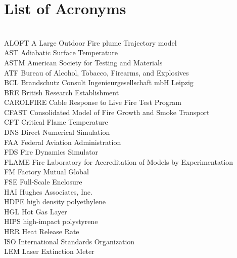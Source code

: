 \documentclass[11pt]{book}
\begin{document}
\cleardoublepage
{}
{}
\tableofcontents

\cleardoublepage
{}
{}
\listoffigures

\cleardoublepage
{}
{}
\listoftables

\chapter{List of Acronyms}

\begin{tabbing}
\hspace{1.5in} \= \\
ALOFT \> A Large Outdoor Fire plume Trajectory model \\
AST \> Adiabatic Surface Temperature \\
ASTM \> American Society for Testing and Materials \\
ATF \> Bureau of Alcohol, Tobacco, Firearms, and Explosives \\
BCL \> Brandschutz Consult Ingenieurgesellschaft mbH Leipzig \\
BRE \> British Research Establishment \\
CAROLFIRE \> Cable Response to Live Fire Test Program \\
CFAST \> Consolidated Model of Fire Growth and Smoke Transport \\
CFT \> Critical Flame Temperature \\
DNS \> Direct Numerical Simulation \\
FAA \> Federal Aviation Administration \\
FDS \> Fire Dynamics Simulator \\
FLAME \> Fire Laboratory for Accreditation of Models by Experimentation \\
FM \> Factory Mutual Global \\
FSE \>  Full-Scale Enclosure \\
HAI \> Hughes Associates, Inc. \\
HDPE \> high density polyethylene \\
HGL \> Hot Gas Layer \\
HIPS \> high-impact polystyrene \\
HRR \> Heat Release Rate \\
ISO \> International Standards Organization \\
LEM \> Laser Extinction Meter \\

\end{tabbing}
\end{document}
